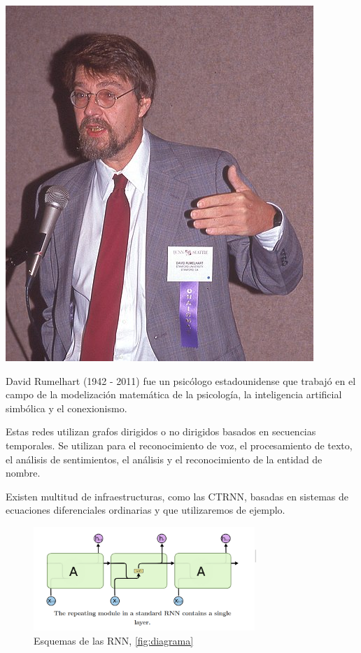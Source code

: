 \documentclass[11pt,twoside,titlepage,a4paper]{article}
\numberwithin{equation}{section} %
\theoremstyle{usual}
\begin{document}
\begin{marginfigure}
    \includegraphics[width=\marginparwidth]{Source/images/David_Rumelhart.jpg}
    \caption{David Rumelhart (1942 - 2011) \cite{Rumelhart} fue un psicólogo estadounidense que trabajó en el campo de la modelización matemática de la psicología, la inteligencia artificial simbólica y el conexionismo.}
\end{marginfigure}

Estas redes utilizan grafos dirigidos o no dirigidos basados en secuencias temporales. Se utilizan para el reconocimiento de voz, el procesamiento de texto, el análisis de sentimientos, el análisis y el reconocimiento de la entidad de nombre. 

Existen multitud de infraestructuras, como las CTRNN,  basadas en sistemas de ecuaciones diferenciales ordinarias y que utilizaremos de ejemplo.

  \begin{figure}[htb]
        \centering
        \includegraphics[width=0.75\textwidth]{Source/images/RNN.png}
        \caption{Esquemas de las RNN, \ref{fig:diagrama}}
        \label{fig:Esquema del RNN}
    \end{figure}
\newpage\restoregeometry
\end{document}
